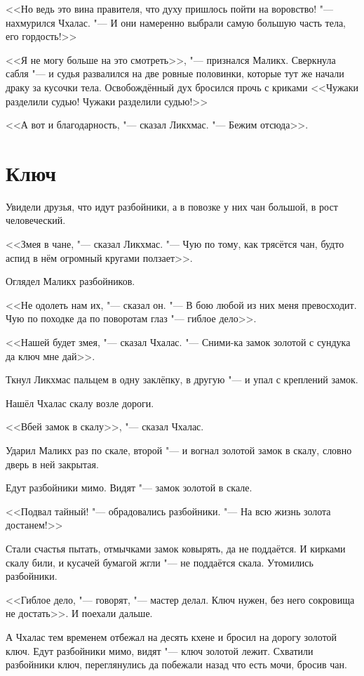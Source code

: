 <<Но ведь это вина правителя, что духу пришлось пойти на воровство! "--- нахмурился Чхалас.
"--- И они намеренно выбрали самую большую часть тела, его гордость!>>

<<Я не могу больше на это смотреть>>, "--- признался Маликх.
Сверкнула сабля "--- и судья развалился на две ровные половинки, которые тут же начали драку за кусочки тела.
Освобождённый дух бросился прочь с криками <<Чужаки разделили судью! Чужаки разделили судью!>>

<<А вот и благодарность, "--- сказал Ликхмас.
"--- Бежим отсюда>>.

\section{Ключ}

Увидели друзья, что идут разбойники, а в повозке у них чан большой, в рост человеческий.

<<Змея в чане, "--- сказал Ликхмас.
"--- Чую по тому, как трясётся чан, будто аспид в нём огромный кругами ползает>>.

Оглядел Маликх разбойников.

<<Не одолеть нам их, "--- сказал он.
"--- В бою любой из них меня превосходит.
Чую по походке да по поворотам глаз "--- гиблое дело>>.

<<Нашей будет змея, "--- сказал Чхалас.
"--- Сними-ка замок золотой с сундука да ключ мне дай>>.

Ткнул Ликхмас пальцем в одну заклёпку, в другую "--- и упал с креплений замок.

Нашёл Чхалас скалу возле дороги.

<<Вбей замок в скалу>>, "--- сказал Чхалас.

Ударил Маликх раз по скале, второй "--- и вогнал золотой замок в скалу, словно дверь в ней закрытая.

Едут разбойники мимо.
Видят "--- замок золотой в скале.

<<Подвал тайный! "--- обрадовались разбойники.
"--- На всю жизнь золота достанем!>>

Стали счастья пытать, отмычками замок ковырять, да не поддаётся.
И кирками скалу били, и кусачей бумагой жгли "--- не поддаётся скала.
Утомились разбойники.

<<Гиблое дело, "--- говорят, "--- мастер делал.
Ключ нужен, без него сокровища не достать>>.
И поехали дальше.

А Чхалас тем временем отбежал на десять кхене и бросил на дорогу золотой ключ.
Едут разбойники мимо, видят "--- ключ золотой лежит.
Схватили разбойники ключ, переглянулись да побежали назад что есть мочи, бросив чан.

